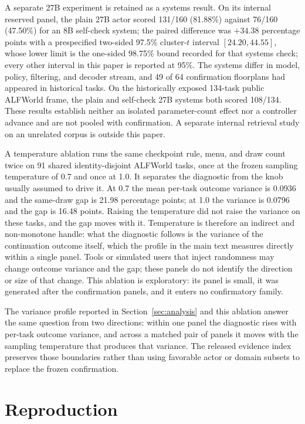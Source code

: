 A separate 27B experiment is retained as a systems result. On its internal reserved panel, the plain 27B actor scored 131/160 (81.88\%) against 76/160 (47.50\%) for an 8B self-check system; the paired difference was $+34.38$ percentage points with a prespecified two-sided 97.5\% cluster-$t$ interval $[24.20,44.55]$, whose lower limit is the one-sided 98.75\% bound recorded for that systems check; every other interval in this paper is reported at 95\%. The systems differ in model, policy, filtering, and decoder stream, and 49 of 64 confirmation floorplans had appeared in historical tasks. On the historically exposed 134-task public ALFWorld frame, the plain and self-check 27B systems both scored 108/134. These results establish neither an isolated parameter-count effect nor a controller advance and are not pooled with confirmation. A separate internal retrieval study on an unrelated corpus is outside this paper.

A temperature ablation runs the same checkpoint rule, menu, and draw count twice on 91 shared identity-disjoint ALFWorld tasks, once at the frozen sampling temperature of 0.7 and once at 1.0. It separates the diagnostic from the knob usually assumed to drive it. At 0.7 the mean per-task outcome variance is 0.0936 and the same-draw gap is 21.98 percentage points; at 1.0 the variance is 0.0796 and the gap is 16.48 points. Raising the temperature did not raise the variance on these tasks, and the gap moves with it. Temperature is therefore an indirect and non-monotone handle: what the diagnostic follows is the variance of the continuation outcome itself, which the profile in the main text measures directly within a single panel. Tools or simulated users that inject randomness may change outcome variance and the gap; these panels do not identify the direction or size of that change. This ablation is exploratory: its panel is small, it was generated after the confirmation panels, and it enters no confirmatory family.


The variance profile reported in Section~\ref{sec:analysis} and this ablation answer the same question from two directions: within one panel the diagnostic rises with per-task outcome variance, and across a matched pair of panels it moves with the sampling temperature that produces that variance. The released evidence index preserves those boundaries rather than using favorable actor or domain subsets to replace the frozen confirmation.

\section{Reproduction}
\label{app:repro}

